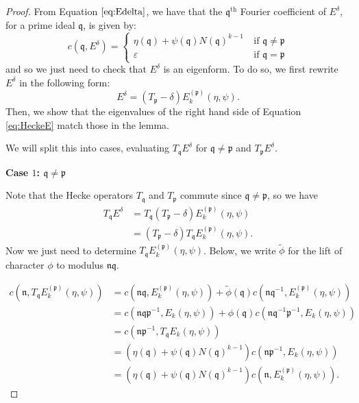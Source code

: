 \documentclass[a4paper,oneside]{amsart}
\theoremstyle{plain}
\theoremstyle{definition}
\begin{document}
\begin{proof}
From Equation $\eqref{eq:Edelta}$, we have that the $\mathfrak{q}^{\text{th}}$ Fourier coefficient of $E^\delta$, for a prime ideal $\mathfrak{q}$, is given by:
\begin{equation}
    c(\mathfrak{q}, E^\delta) = \begin{cases}
    \eta(\mathfrak{q})+\psi(\mathfrak{q})N(\mathfrak{q})^{k-1}\ &\text{if } \mathfrak{q} \neq \mathfrak{p} \\
            \varepsilon \ &\text{if } \mathfrak{q} = \mathfrak{p}
    \end{cases}
\end{equation}
    and so we just need to check that $E^\delta$ is an eigenform. To do so, we first rewrite $E^\delta$ in the following form:
    \begin{equation}
    \label{eq:HeckeE}
        E^\delta = (T_\mathfrak{p} - \delta)E^{(\mathfrak{p})}_k(\eta, \psi).
    \end{equation}
    Then, we show that the eigenvalues of the right hand side of Equation \eqref{eq:HeckeE} match those in the lemma.

    We will split this into cases, evaluating $T_\mathfrak{q}E^\delta$ for $\mathfrak{q} \neq \mathfrak{p}$ and $T_\mathfrak{p}E^\delta$. 

    \vspace{0.2in}
    \textbf{Case $1$: $\mathfrak{q} \neq \mathfrak{p}$}
    
    \vspace{0.1in}
    Note that the Hecke operators $T_\mathfrak{q}$ and $T_\mathfrak{p}$ commute since $\mathfrak{q} \neq \mathfrak{p}$, so we have 
    \begin{align*}
        T_\mathfrak{q}E^\delta &= T_\mathfrak{q}(T_\mathfrak{p} - \delta)E^{(\mathfrak{p})}_k(\eta, \psi) \\
        &= (T_\mathfrak{p} - \delta)T_\mathfrak{q}E^{(\mathfrak{p})}_k(\eta, \psi).
    \end{align*}
     Now we just need to determine $T_\mathfrak{q}E^{(\mathfrak{p})}_k(\eta, \psi)$. Below, we write $\tilde{\phi}$ for the lift of character $\phi$ to modulus $\mathfrak{nq}$.

     \begin{align*}
     c(\mathfrak{n},T_\mathfrak{q}E^{(\mathfrak{p})}_k(\eta, \psi)) &= c(\mathfrak{nq}, E^{(\mathfrak{p})}_k(\eta, \psi)) + \tilde{\phi}(\mathfrak{q})c(\mathfrak{nq}^{-1}, E^{(\mathfrak{p})}_k(\eta, \psi)) \\
         &= c(\mathfrak{nqp}^{-1}, E_k(\eta,\psi)) + \phi(\mathfrak{q})c(\mathfrak{nq}^{-1}\mathfrak{p}^{-1}, E_k(\eta, \psi)) \\
         &= c(\mathfrak{np}^{-1}, T_\mathfrak{q}E_k(\eta,\psi)) \\
         &= (\eta(\mathfrak{q})+\psi(\mathfrak{q})N(\mathfrak{q})^{k-1})c(\mathfrak{np}^{-1}, E_k(\eta,\psi)) \\
         &=(\eta(\mathfrak{q})+\psi(\mathfrak{q})N(\mathfrak{q})^{k-1})c(\mathfrak{n}, E_k^{(\mathfrak{p})}(\eta,\psi)).
    \end{align*}


\end{proof}
\end{document}

